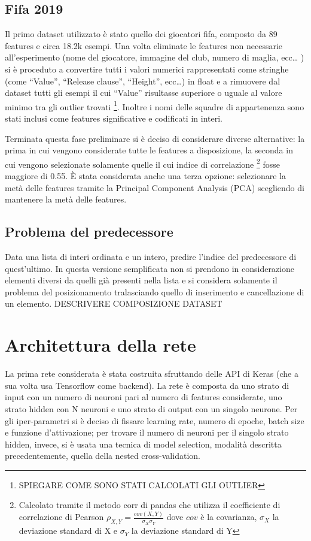 \documentclass[12pt]{report}
\begin{document}
\subsection{Fifa 2019}

Il primo dataset utilizzato è stato quello dei giocatori fifa, composto da 89 features e circa 18.2k esempi. 
Una volta eliminate le features non necessarie all’esperimento (nome del giocatore, immagine del club, numero di maglia, ecc… ) si è proceduto a convertire tutti i valori numerici rappresentati come stringhe (come “Value”, “Release clause”, “Height”, ecc…) in float e a rimuovere dal dataset tutti gli esempi il cui “Value” risultasse superiore o uguale al valore minimo tra gli outlier trovati \footnote{SPIEGARE COME SONO STATI CALCOLATI GLI OUTLIER}. Inoltre i nomi delle squadre di appartenenza sono stati inclusi come features significative e codificati in interi.

Terminata questa fase preliminare si è deciso di considerare diverse alternative: la prima in cui vengono considerate tutte le features a disposizione, la seconda in cui vengono selezionate solamente quelle il cui indice di correlazione \footnote{Calcolato tramite il metodo corr di pandas che utilizza il coefficiente di correlazione di Pearson $\rho_{X,Y} = \frac{cov(X, Y)}{\sigma_X\sigma_Y}$ dove $cov$ è la covarianza, $\sigma_X$ la deviazione standard di X e $\sigma_Y$ la deviazione standard di Y} fosse maggiore di 0.55.
È stata considerata anche una terza opzione: selezionare la metà delle features tramite la Principal Component Analysis (PCA) scegliendo di mantenere la metà delle features. 

\subsection{Problema del predecessore}\label{probPred}
Data una lista di interi ordinata e un intero, predire l'indice del predecessore di quest'ultimo. In questa versione semplificata non si prendono in considerazione elementi diversi da quelli già presenti nella lista e si considera solamente il problema del posizionamento tralasciando quello di inserimento e cancellazione di un elemento.
DESCRIVERE COMPOSIZIONE DATASET

\section{Architettura della rete}
La prima rete considerata è stata costruita sfruttando delle API di Keras (che a sua volta usa Tensorflow come backend). La rete è composta da uno strato di input con un numero di neuroni pari al numero di features considerate, uno strato hidden con N neuroni e uno strato di output con un singolo neurone. Per gli iper-parametri si è deciso di fissare learning rate, numero di epoche, batch size e funzione d'attivazione; per trovare il numero di neuroni per il singolo strato hidden, invece, si è usata una tecnica di model selection, modalità descritta precedentemente, quella della nested cross-validation.
\end{document}
